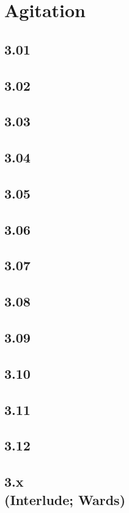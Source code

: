 \part{Agitation}
\chapter{3.01}

\chapter{3.02}

\chapter{3.03}

\chapter{3.04}

\chapter{3.05}

\chapter{3.06}

\chapter{3.07}

\chapter{3.08}

\chapter{3.09}

\chapter{3.10}

\chapter{3.11}

\chapter{3.12}

\chapter[3.x (Interlude; Wards)]{3.x\\(Interlude; Wards)}

